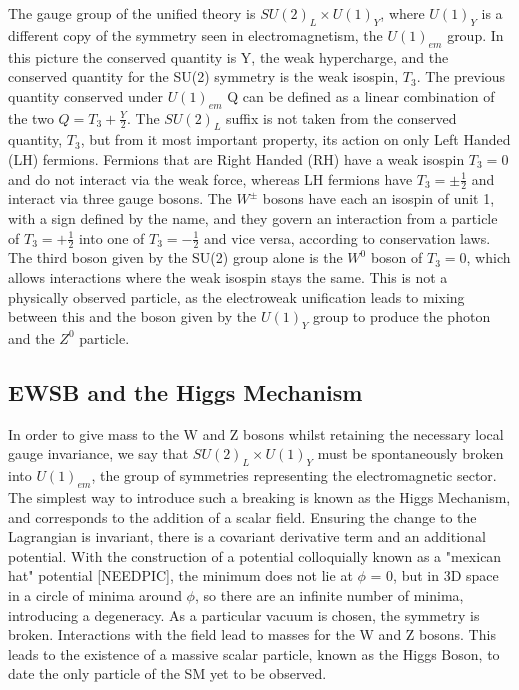 The gauge group of the unified theory is $SU(2)_{L} \times U(1)_{Y}$, where $U(1)_{Y}$ is a different copy of the symmetry seen in electromagnetism, the $U(1)_{em}$ group. In this picture the conserved quantity is Y, the weak hypercharge, and the conserved quantity for the SU(2) symmetry is the weak isospin, $T_{3}$. The previous quantity conserved under $U(1)_{em}$ Q can be defined as a linear combination of the two $Q = T_{3} + \frac{Y}{2}$.  The $SU(2)_{L}$ suffix is not taken from the conserved quantity, $T_{3}$, but from it most important property, its action on only Left Handed (LH) fermions. Fermions that are Right Handed (RH) have a weak isospin $T_{3} = 0$ and do not interact via the weak force, whereas LH fermions have $T_{3} =  \pm \frac{1}{2}$ and interact via three gauge bosons. The $W^{\pm}$ bosons have each an isospin of unit 1, with a sign defined by the name, and they govern an interaction from a particle of $T_{3}=+\frac{1}{2}$ into one of $T_{3}=-\frac{1}{2}$ and vice versa, according to conservation laws. The third boson given by the SU(2) group alone is the $W^{0}$ boson of $T_{3}=0$, which allows interactions where the weak isospin stays the same. This is not a physically observed particle, as the electroweak unification leads to mixing between this and the boson given by the $U(1)_{Y}$ group to produce the photon and the $Z^{0}$ particle. 

\subsection{EWSB and the Higgs Mechanism}

In order to give mass to the W and Z bosons whilst retaining the necessary local gauge invariance, we say that $SU(2)_{L} \times U(1)_{Y}$ must be spontaneously broken into $U(1)_{em}$, the group of symmetries representing the electromagnetic sector. The simplest way to introduce such a breaking is known as the Higgs Mechanism, and corresponds to the addition of a scalar field. Ensuring the change to the Lagrangian is invariant, there is a covariant derivative term and an additional potential. With the construction of a potential colloquially known as a "mexican hat" potential [NEEDPIC], the minimum does not lie at $\phi$ = 0, but in 3D space in a circle of minima around $\phi$, so there are an infinite number of minima, introducing a degeneracy. As a particular vacuum is chosen, the symmetry is broken. Interactions with the field lead to masses for the W and Z bosons. This leads to the existence of a massive scalar particle, known as the Higgs Boson, to date the only particle of the SM yet to be observed. 


